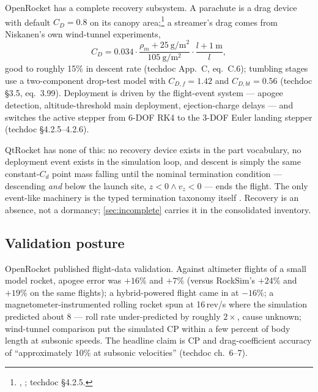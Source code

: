 OpenRocket has a complete recovery subsystem. A parachute is a drag device with default
$C_D = 0.8$ on its canopy area;\footnote{,
; techdoc \S 4.2.5.} a streamer's drag comes from Niskanen's own
wind-tunnel experiments,
\begin{equation}
C_{D} = 0.034\cdot
\frac{\rho_m + 25\ \mathrm{g/m^2}}{105\ \mathrm{g/m^2}}\cdot
\frac{l + 1\ \mathrm{m}}{l},
\end{equation}
good to roughly 15\% in descent rate (techdoc App.~C, eq.~C.6); tumbling stages use a
two-component drop-test model with $C_{D,f} = 1.42$ and $C_{D,bt} = 0.56$ (techdoc \S 3.5,
eq.~3.99). Deployment is driven by the flight-event system --- apogee detection,
altitude-threshold main deployment, ejection-charge delays --- and switches the active
stepper from 6-DOF RK4 to the 3-DOF Euler landing stepper (techdoc \S 4.2.5--4.2.6).

QtRocket has none of this: no recovery device exists in the part vocabulary, no deployment
event exists in the simulation loop, and descent is simply the same constant-$C_d$ point
mass falling until the nominal termination condition --- descending \emph{and} below the
launch site, $z < 0 \wedge v_z < 0$  --- ends the flight. The
only event-like machinery is the typed termination taxonomy itself
. Recovery is an absence, not a dormancy; \cref{sec:incomplete}
carries it in the consolidated inventory.

\subsection{Validation posture}\label{app:or-methods-validation}

OpenRocket published flight-data validation. Against altimeter flights of a small model
rocket, apogee error was $+16\%$ and $+7\%$ (versus RockSim's $+24\%$ and $+19\%$ on the
same flights); a hybrid-powered flight came in at $-16\%$; a magnetometer-instrumented
rolling rocket spun at 16\,rev/s where the simulation predicted about 8 --- roll rate
under-predicted by roughly $2\times$, cause unknown; wind-tunnel comparison put the
simulated CP within a few percent of body length at subsonic speeds. The headline claim is
CP and drag-coefficient accuracy of ``approximately 10\% at subsonic velocities'' (techdoc
ch.~6--7).

